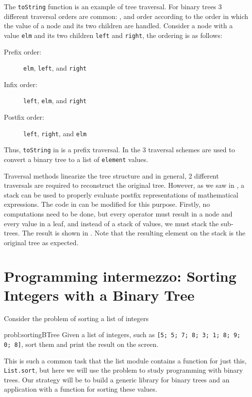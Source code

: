 \documentclass[fsharpNotes.tex]{subfiles}
\begin{document}
  The \lstinline{toString} function is an example of tree traversal. For binary trees 3 different traversal orders are common: ,  and  order according to the order in which the value of a node and its two children are handled. Consider a node with a value \lstinline{elm} and its two children \lstinline{left} and \lstinline{right}, the ordering is as follows:
\begin{description}
\item[Prefix order:] \lstinline{elm}, \lstinline{left}, and \lstinline{right}
\item[Infix order:] \lstinline{left}, \lstinline{elm}, and \lstinline{right}
\item[Postfix order:] \lstinline{left}, \lstinline{right}, and \lstinline{elm} 
\end{description}
Thus, \lstinline{toString} in  is a prefix traversal. In  the 3 traversal schemes are used to convert a binary tree to a list of \lstinline{element} values.
%
%

Traversal methods linearize the tree structure and in general, 2 different traversals are required to reconstruct the original tree. However, as we saw in , a stack can be used to properly evaluate postfix representations of mathematical expressions. The code in  can be modified for this purpose. Firstly, no computations need to be done, but every operator must result in a node and every value in a leaf, and instead of a stack of values, we must stack the sub-trees. The result is shown in .
% 
%
Note that the resulting element on the stack is the original tree as expected.

\section{Programming intermezzo: Sorting Integers with a Binary Tree}
Consider the problem of sorting a list of integers
\begin{task}{probl:sortingBTree}
  Given a list of integers, such as \lstinline{[5; 5; 7; 8; 3; 1; 8; 9; 0; 8]}, sort them and print the result on the screen.
\end{task}
This is such a common task that the list module contains a function for just this, \lstinline{List.sort}, but here we will use the problem to study programming with binary trees. Our strategy will be to build a generic library for binary trees and an application with a function for sorting these values.
\end{document}
